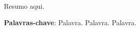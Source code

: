 

Resumo aqui.


\textbf{Palavras-chave}: Palavra. Palavra. Palavra.

\setcounter{page}{3}  %


\newpage

